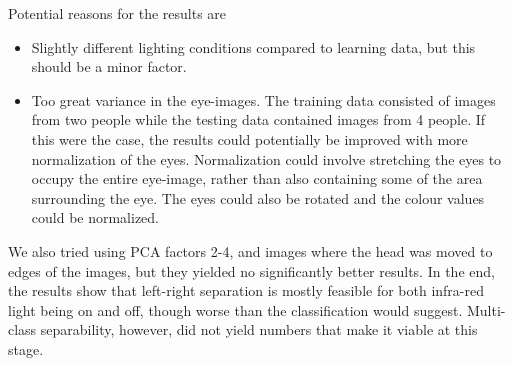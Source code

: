 Potential reasons for the results are
\begin{itemize}
	\item{Slightly different lighting conditions compared to learning data, but this should be a minor factor.}
	\item{Too great variance in the eye-images. 
		The training data consisted of images from two people while the testing data contained images from 4 people. 
		If this were the case, the results could potentially be improved with more normalization of the eyes. 
		Normalization could involve stretching the eyes to occupy the entire eye-image, rather than also containing some of the area surrounding the eye. 
		The eyes could also be rotated and the colour values could be normalized.}
\end{itemize}

We also tried using PCA factors 2-4, and images where the head was moved to edges of the images, but they yielded no significantly better results.
In the end, the results show that left-right separation is mostly feasible for both infra-red light being on and off, though worse than the classification would suggest.
Multi-class separability, however, did not yield numbers that make it viable at this stage.